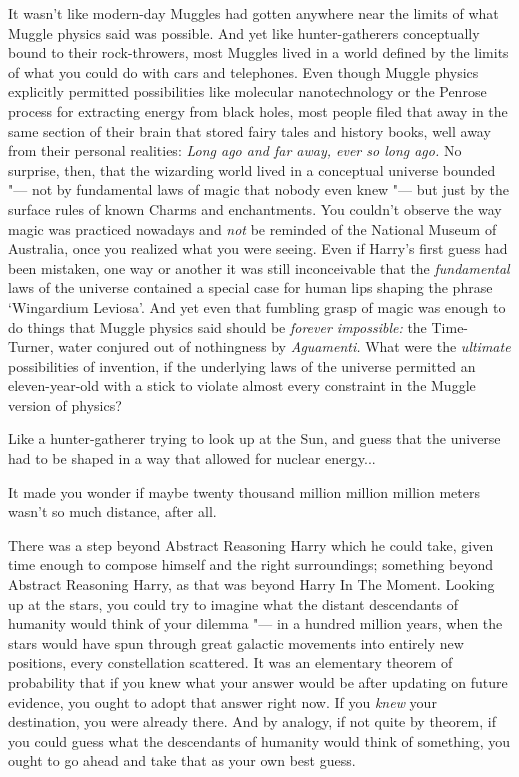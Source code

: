 It wasn't like modern-day Muggles had gotten anywhere near the limits of
what Muggle physics said was possible. And yet like hunter-gatherers
conceptually bound to their rock-throwers, most Muggles lived in a world
defined by the limits of what you could do with cars and telephones.
Even though Muggle physics explicitly permitted possibilities like
molecular nanotechnology or the Penrose process for extracting energy
from black holes, most people filed that away in the same section of
their brain that stored fairy tales and history books, well away from
their personal realities: \emph{Long ago and far away, ever so long
ago.} No surprise, then, that the wizarding world lived in a conceptual
universe bounded "--- not by fundamental laws of magic that nobody even
knew "--- but just by the surface rules of known Charms and enchantments.
You couldn't observe the way magic was practiced nowadays and \emph{not}
be reminded of the National Museum of Australia, once you realized what
you were seeing. Even if Harry's first guess had been mistaken, one way
or another it was still inconceivable that the \emph{fundamental} laws
of the universe contained a special case for human lips shaping the
phrase `Wingardium Leviosa'. And yet even that fumbling grasp of magic
was enough to do things that Muggle physics said should be \emph{forever
impossible:} the Time-Turner, water conjured out of nothingness by
\emph{Aguamenti.} What were the \emph{ultimate} possibilities of
invention, if the underlying laws of the universe permitted an
eleven-year-old with a stick to violate almost every constraint in the
Muggle version of physics?

Like a hunter-gatherer trying to look up at the Sun, and guess that the
universe had to be shaped in a way that allowed for nuclear
energy...

It made you wonder if maybe twenty thousand million million million
meters wasn't so much distance, after all.

There was a step beyond Abstract Reasoning Harry which he could take,
given time enough to compose himself and the right surroundings;
something beyond Abstract Reasoning Harry, as that was beyond Harry In
The Moment. Looking up at the stars, you could try to imagine what the
distant descendants of humanity would think of your dilemma "--- in a
hundred million years, when the stars would have spun through great
galactic movements into entirely new positions, every constellation
scattered. It was an elementary theorem of probability that if you knew
what your answer would be after updating on future evidence, you ought
to adopt that answer right now. If you \emph{knew} your destination, you
were already there. And by analogy, if not quite by theorem, if you
could guess what the descendants of humanity would think of something,
you ought to go ahead and take that as your own best guess.

